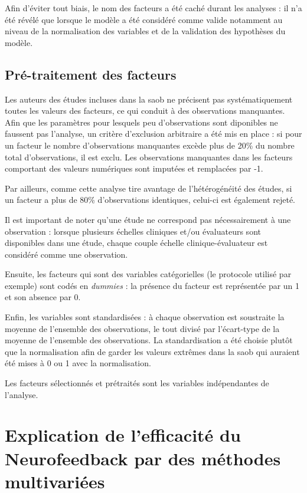 Afin d'éviter tout biais, le nom des facteurs a été caché durant les analyses : il n'a été révélé que lorsque le modèle a été considéré comme valide notamment au niveau 
de la normalisation des variables et de la validation des hypothèses du modèle.  

\subsection{Pré-traitement des facteurs}

Les auteurs des études incluses dans la \gls{saob} ne précisent pas systématiquement toutes les valeurs des facteurs, ce qui conduit à des observations manquantes. Afin que 
les paramètres pour lesquels peu d'observations sont diponibles ne faussent pas l'analyse, un critère d'exclusion arbitraire a été mis en place : si pour un facteur le nombre d'observations 
manquantes excède plus de 20\% du nombre total d'observations, il est exclu. Les observations manquantes dans les facteurs comportant des valeurs numériques sont 
imputées et remplacées par -1.

Par ailleurs, comme cette analyse tire avantage de l'hétérogénéité des études, si un facteur a plus de 80\% d'observations identiques, 
celui-ci est également rejeté. 

Il est important de noter qu'une étude ne correspond pas nécessairement à une observation : lorsque plusieurs échelles cliniques et/ou évaluateurs sont disponibles dans une étude,
chaque couple échelle clinique-évaluateur est considéré comme une observation.

Ensuite, les facteurs qui sont des variables catégorielles (le protocole utilisé par exemple) sont codés en \textit{dummies} : la présence du facteur est représentée par un 1 et son absence par 0. 

Enfin, les variables sont standardisées : à chaque observation est soustraite la moyenne de l'ensemble des observations, le tout divisé par l'écart-type de la moyenne de 
l'ensemble des observations. La standardisation a été choisie plutôt que la normalisation afin de garder les valeurs extrêmes dans la \gls{saob} qui auraient été mises à 0 ou 1 avec 
la normalisation. 

Les facteurs sélectionnés et prétraités sont les variables indépendantes de l'analyse.


\section{Explication de l'efficacité du Neurofeedback par des méthodes multivariées}


